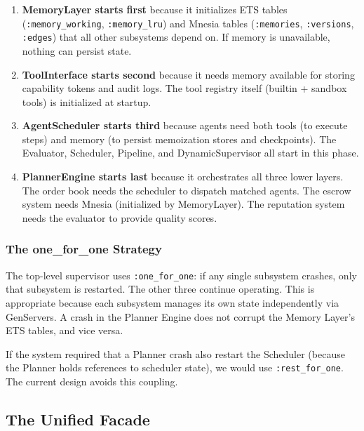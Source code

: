 \documentclass[12pt,a4paper]{article}
\theoremstyle{definition}
\begin{document}
\begin{enumerate}
  \item \textbf{MemoryLayer starts first} because it initializes ETS tables
        (\texttt{:memory\_working}, \texttt{:memory\_lru}) and Mnesia tables
        (\texttt{:memories}, \texttt{:versions}, \texttt{:edges}) that all other
        subsystems depend on. If memory is unavailable, nothing can persist state.

  \item \textbf{ToolInterface starts second} because it needs memory available for
        storing capability tokens and audit logs. The tool registry itself
        (builtin + sandbox tools) is initialized at startup.

  \item \textbf{AgentScheduler starts third} because agents need both tools
        (to execute steps) and memory (to persist memoization stores and checkpoints).
        The Evaluator, Scheduler, Pipeline, and DynamicSupervisor all start in this phase.

  \item \textbf{PlannerEngine starts last} because it orchestrates all three lower
        layers. The order book needs the scheduler to dispatch matched agents.
        The escrow system needs Mnesia (initialized by MemoryLayer). The reputation
        system needs the evaluator to provide quality scores.
\end{enumerate}

\subsubsection{The one\_for\_one Strategy}

The top-level supervisor uses \texttt{:one\_for\_one}: if any single subsystem
crashes, only that subsystem is restarted. The other three continue operating.
This is appropriate because each subsystem manages its own state independently
via GenServers. A crash in the Planner Engine does not corrupt the Memory Layer's
ETS tables, and vice versa.

If the system required that a Planner crash also restart the Scheduler (because
the Planner holds references to scheduler state), we would use
\texttt{:rest\_for\_one}. The current design avoids this coupling.

\subsection{The Unified Facade}\label{subsec:facade}
\end{document}
